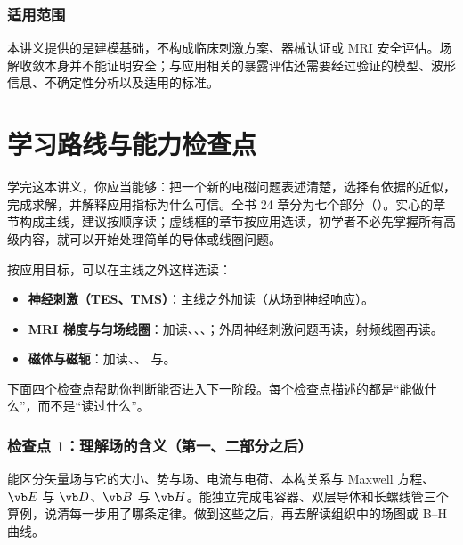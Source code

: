 \subsection*{适用范围}
本讲义提供的是建模基础，不构成临床刺激方案、器械认证或 MRI 安全评估。场解收敛本身并不能证明安全；与应用相关的暴露评估还需要经过验证的模型、波形信息、不确定性分析以及适用的标准。

\chapter*{学习路线与能力检查点}

学完这本讲义，你应当能够：把一个新的电磁问题表述清楚，选择有依据的近似，完成求解，并解释应用指标为什么可信。全书 24 章分为七个部分（）。实心的章节构成主线，建议按顺序读；虚线框的章节按应用选读，初学者不必先掌握所有高级内容，就可以开始处理简单的导体或线圈问题。


按应用目标，可以在主线之外这样选读：
\begin{itemize}
\item \textbf{神经刺激（TES、TMS）}：主线之外加读（从场到神经响应）。
\item \textbf{MRI 梯度与匀场线圈}：加读、、、；外周神经刺激问题再读，射频线圈再读。
\item \textbf{磁体与磁轭}：加读、、 与。
\end{itemize}

下面四个检查点帮助你判断能否进入下一阶段。每个检查点描述的都是“能做什么”，而不是“读过什么”。

\subsection*{检查点 1：理解场的含义（第一、二部分之后）}
能区分矢量场与它的大小、势与场、电流与电荷、本构关系与 Maxwell 方程、$\vb E$ 与 $\vb D$、$\vb B$ 与 $\vb H$。能独立完成电容器、双层导体和长螺线管三个算例，说清每一步用了哪条定律。做到这些之后，再去解读组织中的场图或 B--H 曲线。

